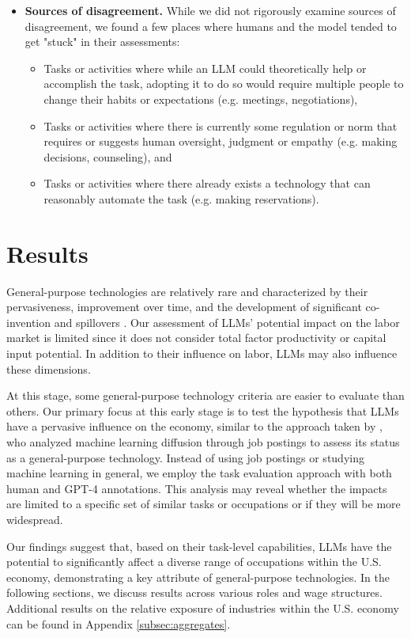 \documentclass[11pt]{article}
\begin{document}
\begin{itemize}
\item \textbf{Sources of disagreement.} While we did not rigorously examine sources of disagreement, we found a few places where humans and the model tended to get "stuck" in their assessments:
\begin{itemize}
    \item Tasks or activities where while an LLM could theoretically help or accomplish the task, adopting it to do so would require multiple people to change their habits or expectations (e.g. meetings, negotiations),
    \item Tasks or activities where there is currently some regulation or norm that requires or suggests human oversight, judgment or empathy (e.g. making decisions, counseling), and
    \item Tasks or activities where there already exists a technology that can reasonably automate the task (e.g. making reservations).
\end{itemize}
\end{itemize}

\section{Results}
\label{sec:econimpact}

 
General-purpose technologies are relatively rare and characterized by their pervasiveness, improvement over time, and the development of significant co-invention and spillovers \citep{lipsey2005economic}. Our assessment of LLMs' potential impact on the labor market is limited since it does not consider total factor productivity or capital input potential. In addition to their influence on labor, LLMs may also influence these dimensions.

At this stage, some general-purpose technology criteria are easier to evaluate than others. Our primary focus at this early stage is to test the hypothesis that LLMs have a pervasive influence on the economy, similar to the approach taken by \citep{goldfarb2023could}, who analyzed machine learning diffusion through job postings to assess its status as a general-purpose technology. Instead of using job postings or studying machine learning in general, we employ the task evaluation approach with both human and GPT-4 annotations. This analysis may reveal whether the impacts are limited to a specific set of similar tasks or occupations or if they will be more widespread.

Our findings suggest that, based on their task-level capabilities, LLMs have the potential to significantly affect a diverse range of occupations within the U.S. economy, demonstrating a key attribute of general-purpose technologies. In the following sections, we discuss results across various roles and wage structures. Additional results on the relative exposure of industries within the U.S. economy can be found in Appendix \ref{subsec:aggregates}.
\end{document}
